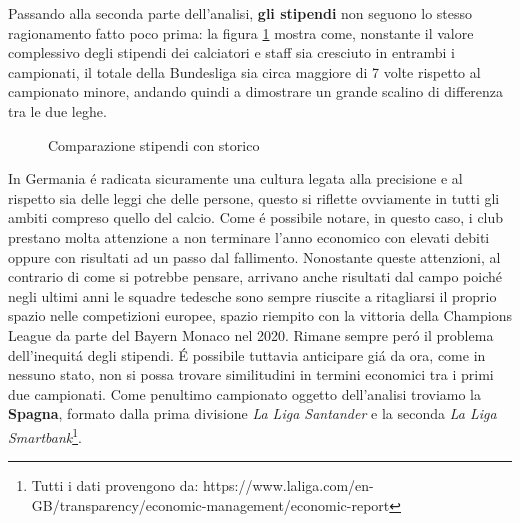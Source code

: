 \documentclass[
    corpo=12pt,
    oneside,
    evenboxes,
    tipotesi=triennale,
    stile=classica,
    oldstyle,
    autoretitolo,
    greek,
]{toptesi}
\begin{document}
\begin{interlinea}{1.5}
Passando alla seconda parte dell'analisi, \textbf{gli stipendi} non seguono lo stesso ragionamento fatto poco prima: la figura 
\ref{comparazione_stipendi_germania} mostra come, nonstante il valore complessivo degli stipendi dei calciatori e staff sia cresciuto in entrambi
i campionati, il totale della Bundesliga sia circa maggiore di 7 volte rispetto al campionato minore, andando quindi a dimostrare
un grande scalino di differenza tra le due leghe.
\begin{figure}
    \centering
     \quad
    \caption{Comparazione stipendi con storico}
    \label{comparazione_stipendi_germania}  
\end{figure}
In Germania \'e radicata sicuramente una cultura legata alla precisione e al rispetto sia delle leggi che delle persone, questo si riflette 
ovviamente in tutti gli ambiti compreso quello del calcio. Come \'e possibile notare, in questo caso, i club prestano molta attenzione a non 
terminare l'anno economico con elevati debiti oppure con risultati ad un passo dal fallimento. Nonostante queste attenzioni, al contrario
di come si potrebbe pensare, arrivano anche risultati dal campo poich\'e negli ultimi anni le squadre tedesche sono sempre riuscite a ritagliarsi 
il proprio spazio nelle competizioni europee, spazio riempito con la vittoria della Champions League da parte del Bayern Monaco nel 2020. 
Rimane sempre per\'o il problema dell'inequit\'a degli stipendi. \'E possibile tuttavia anticipare gi\'a da ora, come in nessuno stato, non si possa
trovare similitudini in termini economici tra i primi due campionati.\newline
Come penultimo campionato oggetto dell'analisi troviamo la \textbf{Spagna}, formato dalla prima divisione \emph{La Liga Santander} e la seconda
\emph{La Liga Smartbank}\footnote{Tutti i dati provengono da: https://www.laliga.com/en-GB/transparency/economic-management/economic-report}.

\end{interlinea}
\end{document}

